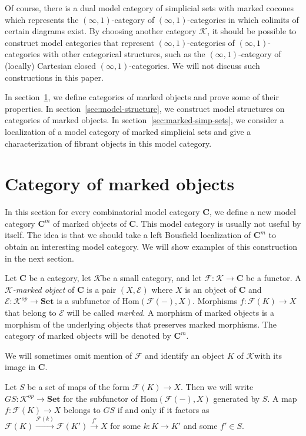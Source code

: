 \documentclass[reqno]{amsart}
\theoremstyle{definition}
\theoremstyle{remark}
\newcommand{\cat}[1]{\mathbf{#1}}
\newcommand{\C}{\cat{C}}
\newcommand{\Set}{\cat{Set}}
\newcommand{\K}{$\mathcal{K}$}
\newcommand{\Hom}{\mathrm{Hom}}
\numberwithin{figure}{section}
\begin{document}
Of course, there is a dual model category of simplicial sets with marked cocones which represents the $(\infty,1)$-category of $(\infty,1)$-categories in which colimits of certain diagrams exist.
By choosing another category \K, it should be possible to construct model categories that represent $(\infty,1)$-categories of $(\infty,1)$-categories with other categorical structures,
such as the $(\infty,1)$-category of (locally) Cartesian closed $(\infty,1)$-categories.
We will not discuss such constructions in this paper.

In section~\ref{sec:marked}, we define categories of marked objects and prove some of their properties.
In section~\ref{sec:model-structure}, we construct model structures on categories of marked objects.
In section~\ref{sec:marked-simp-sets}, we consider a localization of a model category of marked simplicial sets and give a characterization of fibrant objects in this model category.

\section{Category of marked objects}
\label{sec:marked}

In this section for every combinatorial model category $\C$, we define a new model category $\C^m$ of marked objects of $\C$.
This model category is usually not useful by itself.
The idea is that we should take a left Bousfield localization of $\C^m$ to obtain an interesting model category.
We will show examples of this construction in the next section.

\begin{defn}
Let $\C$ be a category, let \K be a small category, and let $\mathcal{F} : \mathcal{K} \to \C$ be a functor.
A \emph{\K-marked object} of $\C$ is a pair $(X,\mathcal{E})$ where $X$ is an object of $\C$ and $\mathcal{E} : \mathcal{K}^{op} \to \Set$ is a subfunctor of $\Hom(\mathcal{F}(-),X)$.
Morphisms $f : \mathcal{F}(K) \to X$ that belong to $\mathcal{E}$ will be called \emph{marked}.
A morphism of marked objects is a morphism of the underlying objects that preserves marked morphisms.
The category of marked objects will be denoted by $\C^m$.
\end{defn}

We will sometimes omit mention of $\mathcal{F}$ and identify an object $K$ of \K with its image in $\C$.

Let $S$ be a set of maps of the form $\mathcal{F}(K) \to X$.
Then we will write $GS : \mathcal{K}^{op} \to \Set$ for the subfunctor of $\Hom(\mathcal{F}(-),X)$ generated by $S$.
A map $f : \mathcal{F}(K) \to X$ belongs to $GS$ if and only if it factors as $\mathcal{F}(K) \xrightarrow{\mathcal{F}(k)} \mathcal{F}(K') \xrightarrow{f'} X$
for some $k : K \to K'$ and some $f' \in S$.
\end{document}
